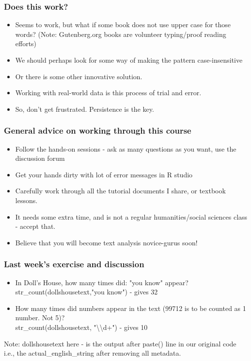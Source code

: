 \documentclass{beamer}
\begin{document}
\begin{frame}
\frametitle{Does this work?}
\begin{itemize}
\item Seems to work, but what if some book does not use upper case for those words? (Note: Gutenberg.org books are volunteer typing/proof reading efforts) \pause
\item We should perhaps look for some way of making the pattern case-insensitive
\item Or there is some other innovative solution. \pause
\item Working with real-world data is this process of trial and error. 
\item So, don't get frustrated. Persistence is the key. 
\end{itemize}
\end{frame}

\begin{frame}
\frametitle{General advice on working through this course}
\begin{itemize}
\item Follow the hands-on sessions - ask as many questions as you want, use the discussion forum
\item Get your hands dirty with lot of error messages in R studio
\item Carefully work through all the tutorial documents I share, or textbook lessons. 
\item It needs some extra time, and is not a regular humanities/social sciences class - accept that.
\item Believe that you will become text analysis novice-gurus soon!
\end{itemize}
\end{frame}

\begin{frame}
\frametitle{Last week's exercise and discussion}
\begin{itemize}
\item In Doll's House, how many times did: "you know" appear? \\
str\_count(dollshousetext,"you know") - gives 32
\item How many times did numbers  appear in the text (99712 is to be counted as 1 number. Not 5)?
\\ str\_count(dollshousetext, "\textbackslash\textbackslash d+") - gives 10
\end{itemize}
Note: dollshousetext here - is the output after paste() line in our original code i.e., the actual\_english\_string after removing all metadata.
\end{frame}
\end{document}
